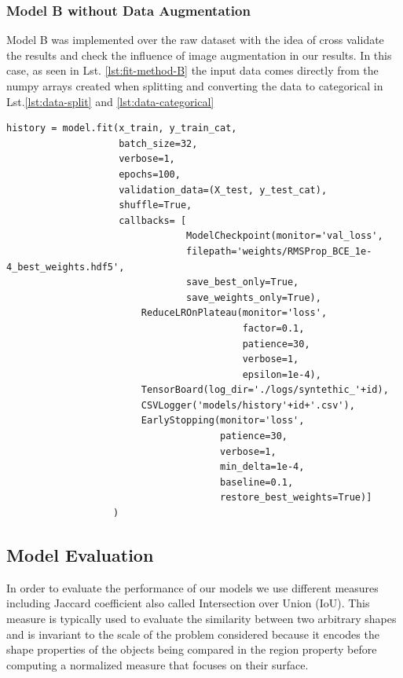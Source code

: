 \documentclass[12pt,a4paper]{scrartcl}
\begin{document}
\subsubsection{Model B without Data Augmentation}

Model B was implemented over the raw dataset with the idea of cross validate the results and check the influence of image augmentation in our results. In this case, as seen in Lst. \ref{lst:fit-method-B} the input data comes directly from the numpy arrays created when splitting and converting the data to categorical in Lst.\ref{lst:data-split} and \ref{lst:data-categorical} 

\begin{lstlisting}[caption={Model B training parameters, this is a code snippet from the  \emph{train\_model\_B} method in \emph{train.py}},label={lst:fit-method-B}]
history = model.fit(x_train, y_train_cat,
                    batch_size=32,
                    verbose=1, 
                    epochs=100, 
                    validation_data=(X_test, y_test_cat), 
                    shuffle=True,
                    callbacks= [
                                ModelCheckpoint(monitor='val_loss',
                                filepath='weights/RMSProp_BCE_1e-4_best_weights.hdf5',
                                save_best_only=True,
                                save_weights_only=True),
                        ReduceLROnPlateau(monitor='loss',
                                          factor=0.1,
                                          patience=30,
                                          verbose=1,
                                          epsilon=1e-4),
                        TensorBoard(log_dir='./logs/syntethic_'+id),
                        CSVLogger('models/history'+id+'.csv'),
                        EarlyStopping(monitor='loss',
                                      patience=30,
                                      verbose=1,
                                      min_delta=1e-4,
                                      baseline=0.1,
                                      restore_best_weights=True)]
                   )

\end{lstlisting}

\subsection{Model Evaluation}
In order to evaluate the performance of our models we use different measures including Jaccard coefficient also called Intersection over Union (IoU). This measure is typically used to evaluate the similarity between two arbitrary shapes and is invariant to the scale of the problem considered because it encodes the shape properties of the objects being compared in the region property before computing a normalized measure that focuses on their surface\cite{IoU:2019}.
\end{document}
